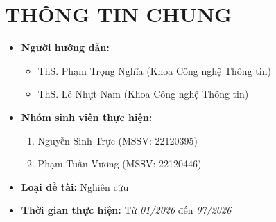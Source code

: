 \documentclass[14pt]{article}  %
\begin{document}
    \section{THÔNG TIN CHUNG}
    \begin{itemize}[label = {}]

        \item \textbf{Người hướng dẫn:}
        \begin{itemize}
            \item ThS. Phạm Trọng Nghĩa (Khoa Công nghệ Thông tin)
            \item ThS. Lê Nhựt Nam (Khoa Công nghệ Thông tin)
        \end{itemize}{}


        \item \textbf{Nhóm sinh viên thực hiện:}

        \begin{enumerate}

            \item Nguyễn Sinh Trực (MSSV: 22120395)
            \item Phạm Tuấn Vương (MSSV: 22120446)
        \end{enumerate}

        \item \textbf{Loại đề tài:} Nghiên cứu

        \item \textbf{Thời gian thực hiện:} Từ \textit{01/2026} đến \textit{07/2026}


    \end{itemize}

    \pagebreak
\end{document}
